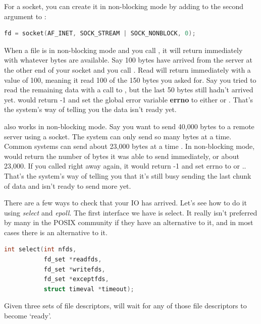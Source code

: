 For a socket, you can create it in non-blocking mode by adding  to the second argument to :

\begin{lstlisting}[language=C]
fd = socket(AF_INET, SOCK_STREAM | SOCK_NONBLOCK, 0);
\end{lstlisting}

When a file is in non-blocking mode and you call , it will return immediately with whatever bytes are available.
Say 100 bytes have arrived from the server at the other end of your socket and you call .
Read will return immediately with a value of 100, meaning it read 100 of the 150 bytes you asked for.
Say you tried to read the remaining data with a call to , but the last 50 bytes still hadn't arrived yet.
 would return -1 and set the global error variable \textbf{errno} to either  or .
That's the system's way of telling you the data isn't ready yet.

 also works in non-blocking mode.
Say you want to send 40,000 bytes to a remote server using a socket.
The system can only send so many bytes at a time.
Common systems can send about 23,000 bytes at a time .
In non-blocking mode,  would return the number of bytes it was able to send immediately, or about 23,000.
If you called  right away again, it would return -1 and set errno to  or ..
That's the system's way of telling you that it's still busy sending the last chunk of data and isn't ready to send more yet.

There are a few ways to check that your IO has arrived.
Let's see how to do it using \emph{select} and \emph{epoll}.
The first interface we have is select.
It really isn't preferred by many in the POSIX community if they have an alternative to it, and in most cases there is an alternative to it.

\begin{lstlisting}[language=C]
int select(int nfds,
           fd_set *readfds,
           fd_set *writefds,
           fd_set *exceptfds,
           struct timeval *timeout);
\end{lstlisting}

Given three sets of file descriptors,  will wait for any of those file descriptors to become `ready'.

